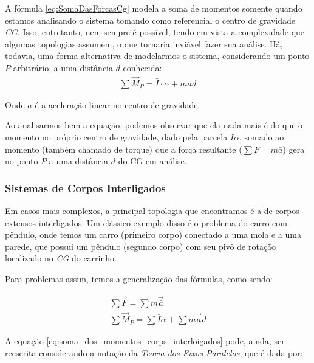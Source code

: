 \documentclass{article}
\begin{document}
                A fórmula \ref{eq:SomaDasForcasCg} modela a soma de momentos somente quando estamos analisando o sistema tomando como referencial o centro de gravidade \emph{CG}. Isso,
                entretanto, nem sempre é possível, tendo em vista a complexidade que algumas topologias assumem, o que tornaria inviável fazer sua análise. Há, todavia, uma forma alternativa de
                modelarmos o sistema, considerando um ponto $P$ arbitrário, a uma distância $d$ conhecida:
                \begin{align}
                    \sum \vec M_P = \bar I \cdot \alpha + m \bar a d \label{eq:soma_dos_momentos_ponto_p}
                \end{align}

                Onde $a$ é a aceleração linear no centro de gravidade. 
                
                Ao analisarmos bem a equação, podemos observar que ela nada mais é do que o momento no próprio centro de gravidade, dado pela parcela $\bar I \alpha$, somado ao momento (também
                chamado de torque) que a força resultante ($\sum F = m \bar a$) gera no ponto $P$ a uma distância $d$ do CG em análise.

            \subsubsection[Sis. de Corps. Interligados]{Sistemas de Corpos Interligados}
                
                Em casos mais complexos, a principal topologia que encontramos é a de corpos extensos interligados. Um clássico exemplo disso é o problema do carro com pêndulo, onde temos um carro
                (primeiro corpo) conectado a uma mola e a uma parede, que possui um pêndulo (segundo corpo) com seu  pivô de rotação localizado no \emph{CG} do carrinho.

                Para problemas assim, temos a generalização das fórmulas, como sendo:

                \begin{align}
                    \sum \vec F = \sum m \vec{\bar a} \label{eq:soma_das_forcas_corps_interligados} \\
                    \sum \vec{M}_P = \sum \bar I  \alpha + \sum m \vec{\bar a} d \label{eq:soma_dos_momentos_corps_interloigados}
                \end{align}

                A equação \ref{eq:soma_dos_momentos_corps_interloigados} pode, ainda, ser reescrita considerando a notação da \emph{Teoria dos Eixos Paralelos}, que é dada por:
                
\end{document}

